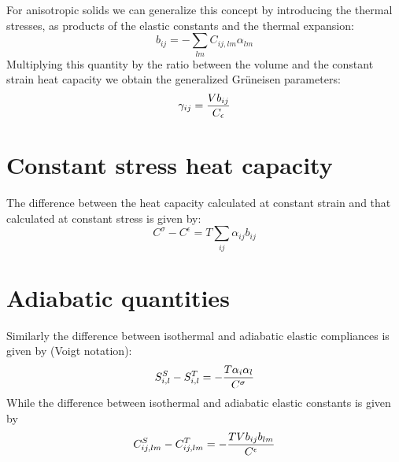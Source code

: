 \documentclass[12pt,a4paper]{article}
\begin{document}
For anisotropic solids we can generalize this concept by introducing
the thermal stresses, as products of the elastic constants and the
thermal expansion:
\begin{equation}
b_{ij} = -\sum_{lm} C_{ij,lm} \alpha_{lm}
\end{equation}
Multiplying this quantity by the ratio between the volume and the
constant strain heat capacity we obtain the generalized Gr\"uneisen
parameters:
\begin{equation}
\gamma_{ij} =  {V b_{ij} \over C_\epsilon}
\end{equation}

\newpage
\section{\color{coral}Constant stress heat capacity}

The difference between the heat capacity calculated at constant strain 
and that calculated at constant stress is given by:
\begin{equation}
C^\sigma - C^\epsilon = T \sum_{ij} \alpha_{ij} b_{ij}
\end{equation}

\newpage
\section{\color{coral}Adiabatic quantities}

Similarly the difference between isothermal and adiabatic
elastic compliances is given by (Voigt notation):
\begin{equation}
S^S_{i,l} - S^T_{i,l} = - {T \alpha_{i} \alpha_{l} \over C^\sigma}
\end{equation}
While the difference between isothermal and adiabatic elastic constants
is given by
\begin{equation}
C^S_{ij,lm} - C^T_{ij,lm} = - {T V b_{ij} b_{lm} \over C^\epsilon}
\end{equation}

\newpage
\end{document}

